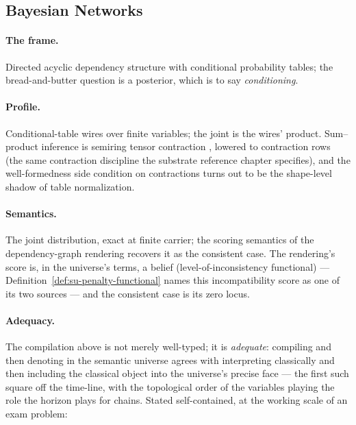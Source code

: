 \subsection{Bayesian Networks}
\label{sec:mt-bn}

\paragraph{The frame.} Directed acyclic dependency structure with
conditional probability tables; the bread-and-butter question is a
posterior, which is to say \emph{conditioning}.

\paragraph{Profile.} Conditional-table wires over finite variables;
the joint is the wires' product. Sum--product inference is semiring
tensor contraction \cite{peterseim26}, lowered to contraction rows (the same
contraction discipline the substrate reference chapter specifies),
and the well-formedness side condition on contractions turns out to
be the shape-level shadow of table normalization.

\paragraph{Semantics.} The joint distribution, exact at finite
carrier; the scoring semantics of the dependency-graph rendering
recovers it as the consistent case. The rendering's score is, in the
universe's terms, a belief (level-of-inconsistency functional) ---
Definition~\ref{def:su-penalty-functional} names this
incompatibility score as one of its two sources --- and the
consistent case is its zero locus.

\paragraph{Adequacy.} The compilation above is not merely
well-typed; it is \emph{adequate}: compiling and then denoting in
the semantic universe agrees with interpreting classically and then
including the classical object into the universe's precise face ---
the first such square off the time-line, with the topological order
of the variables playing the role the horizon plays for chains.
Stated self-contained, at the working scale of an exam problem:

